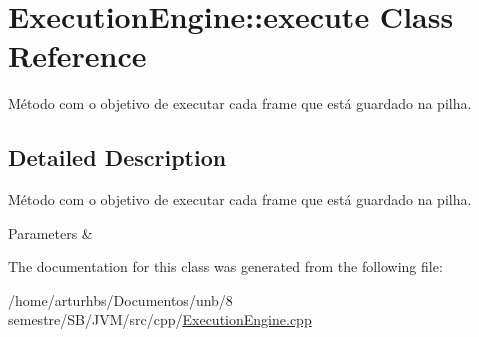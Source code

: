 \hypertarget{classExecutionEngine_1_1execute}{}\section{Execution\+Engine\+:\+:execute Class Reference}
\label{classExecutionEngine_1_1execute}


Método com o objetivo de executar cada frame que está guardado na pilha.  




\subsection{Detailed Description}
Método com o objetivo de executar cada frame que está guardado na pilha. 


\begin{DoxyParams}{Parameters}
{\em } & \\
\hline
\end{DoxyParams}


The documentation for this class was generated from the following file\+:\begin{DoxyCompactItemize}
\item 
/home/arturhbs/\+Documentos/unb/8 semestre/\+S\+B/\+J\+V\+M/src/cpp/\hyperlink{ExecutionEngine_8cpp}{Execution\+Engine.\+cpp}\end{DoxyCompactItemize}
